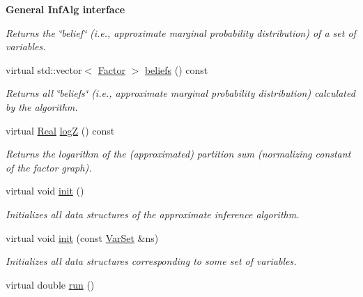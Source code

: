 \begin{Indent}{\bf General InfAlg interface}
\begin{CompactItemize}
\begin{CompactList}\small\item\em Returns the \char`\"{}belief\char`\"{} (i.e., approximate marginal probability distribution) of a set of variables. \item\end{CompactList}\item 
\hypertarget{classdai_1_1MF_a6c307192d3b4141e2d1b0b46f3319a8}{
virtual std::vector$<$ \hyperlink{classdai_1_1TFactor}{Factor} $>$ \hyperlink{classdai_1_1MF_a6c307192d3b4141e2d1b0b46f3319a8}{beliefs} () const }
\label{classdai_1_1MF_a6c307192d3b4141e2d1b0b46f3319a8}

\begin{CompactList}\small\item\em Returns all \char`\"{}beliefs\char`\"{} (i.e., approximate marginal probability distribution) calculated by the algorithm. \item\end{CompactList}\item 
\hypertarget{classdai_1_1MF_ad8b559b72143257ca997bd5975a1d69}{
virtual \hyperlink{namespacedai_e7d0472fdc89a8635825d01940e91cbf}{Real} \hyperlink{classdai_1_1MF_ad8b559b72143257ca997bd5975a1d69}{logZ} () const }
\label{classdai_1_1MF_ad8b559b72143257ca997bd5975a1d69}

\begin{CompactList}\small\item\em Returns the logarithm of the (approximated) partition sum (normalizing constant of the factor graph). \item\end{CompactList}\item 
virtual void \hyperlink{classdai_1_1MF_eb993d502d0cb97424ebff82e0cf6839}{init} ()
\begin{CompactList}\small\item\em Initializes all data structures of the approximate inference algorithm. \item\end{CompactList}\item 
virtual void \hyperlink{classdai_1_1MF_49ddd5c9c9f51ee9fb5e153b7194ac71}{init} (const \hyperlink{classdai_1_1VarSet}{VarSet} \&ns)
\begin{CompactList}\small\item\em Initializes all data structures corresponding to some set of variables. \item\end{CompactList}\item 
\hypertarget{classdai_1_1MF_bd9d1de4bfb3fb538c9949a7c82d7984}{
virtual double \hyperlink{classdai_1_1MF_bd9d1de4bfb3fb538c9949a7c82d7984}{run} ()}
\label{classdai_1_1MF_bd9d1de4bfb3fb538c9949a7c82d7984}


\end{CompactItemize}
\end{Indent}
